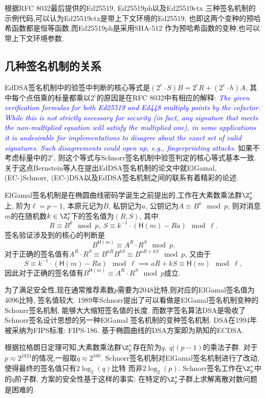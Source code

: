 根据RFC 8032最后提供的\textsf{Ed25519}, \textsf{Ed25519ph}以及\textsf{Ed25519ctx}
三种签名机制的示例代码,可以认为\textsf{Ed25519ctx}是带上下文环境的\textsf{Ed25519},
也即这两个变种的预哈希函数都是恒等函数,而\textsf{Ed25519ph}是采用\textsf{SHA-512}
作为预哈希函数的变种,也可以带上下文环境参数.

\subsection{几种签名机制的关系}

EdDSA签名机制中的验签中判断的核心等式是$(2^c\cdot S)B = 2^c R + (2^c\cdot h)A$,
其中每个点倍乘的标量都乘以$2^c$的原因是在RFC 8032中有相应的解释:
\textcolor{blue}{
\textit{The given verification formulas for both Ed25519 and Ed448 multiply points by the cofactor. 
While this is not strictly necessary for security (in fact, 
any signature that meets the non-multiplied equation will satisfy the multiplied one), 
in some applications it is undesirable for implementations to disagree about 
the exact set of valid signatures. Such disagreements could open up, e.g., fingerprinting attacks.}}
如果不考虑标量中的$2^c$, 则这个等式与Schnorr签名机制中验签判定的核心等式基本一致.
关于这点Bernstein等人在提出EdDSA签名机制的论文中就ElGamal,  (EC-)Schnorr, 
(EC-)DSA以及EdDSA签名机制之间的联系有着精彩的论述.

ElGamal签名机制是在椭圆曲线密码学诞生之前提出的,工作在大素数乘法群$\Z^*_p$上,
阶为$\ell = p-1$, 本原元记为$B$, 私钥记为$a$, 公钥记为$A \equiv B^a \mod p$, 
则对消息$m$的在随机数$k \in\Z^*_{\ell}$下的签名值为$(R, S)$, 其中
$$R \equiv B^k \mod p, \ S \equiv k^{-1} \cdot (\textsf{H}(m) - Ra) \mod \ell.$$
签名验证涉及到的核心的判断是
$$B^{\textsf{H}(m)} \equiv A^R \cdot R^S \mod p.$$
对于正确的签名值有$A^R \cdot R^S \equiv B^{aR} B^{kS} \equiv B^{aR + kS} \mod p$,
又由于
$$S \equiv k^{-1} \cdot (\textsf{H}(m) - Ra) \mod \ell \implies aR + kS \equiv \textsf{H}(m) \mod \ell,$$
因此对于正确的签名值有$B^{\textsf{H}(m)} \equiv A^R \cdot R^S \mod p$成立.

为了满足安全性,现在通常推荐素数$p$需要为2048比特,则对应的ElGamal签名值为4096比特,
签名值较大. 1989年Schnorr提出了可以看做是ElGamal签名机制变种的Schonrr签名机制,
能够大大缩短签名值的长度. 而数字签名算法DSA是吸收了Schnorr签名设计思想的另一种ElGamal
签名机制的变种签名机制. DSA在1994年被采纳为FIPS标准: FIPS-186.
基于椭圆曲线的DSA方案即为熟知的ECDSA.

根据拉格朗日定理可知,大素数乘法群$\Z^*_p$存在阶为$q,\ q | (p-1)$的乘法子群.
对于$p\approx2^{1024}$的情况,一般取$q \approx2^{160}$.
Schnorr签名机制对ElGamal签名机制进行了改动,使得最终的签名值只有$2\log_2(q)$比特
而非$2\log_2(p)$. Schnorr签名工作在$\Z^*_p$中的$q$阶子群,
方案的安全性基于这样的事实: 在特定的$\Z^*_p$子群上求解离散对数问题是困难的.

